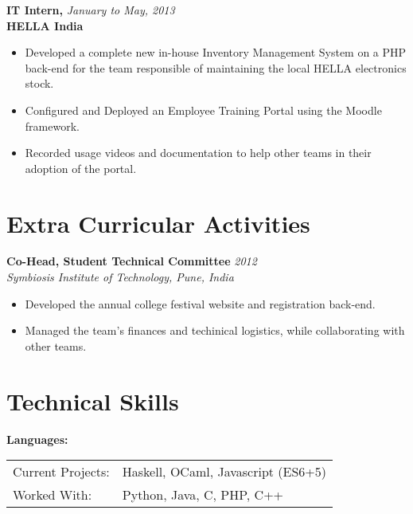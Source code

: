 \documentclass[a4paper,overlapped]{res}
\begin{document}
\begin{resume}
  \textbf{IT Intern,} \hfill \textit{January to May, 2013}\\
  \textbf{HELLA India}
  \begin{itemize}
  \item Developed a complete new in-house Inventory Management System on a PHP
    back-end for the team responsible of maintaining the local HELLA electronics stock.
  \item Configured and Deployed an Employee Training Portal using the
    Moodle framework.
  \item Recorded usage videos and documentation to help other teams in their
    adoption of the portal.
  \end{itemize}

  \section{Extra Curricular Activities}  

  \textbf{Co-Head, Student Technical Committee}   \hfill \textit{2012} \\
  \textit{Symbiosis Institute of Technology, Pune, India}
  \begin{itemize}
  \item Developed the annual college festival website and registration back-end.
  \item Managed the team's finances and techinical logistics, while collaborating 
    with other teams.
  \end{itemize}

  \section{Technical Skills} 
  \textbf{Languages:} \\ 
  \begin{tabular}{l l}
    Current Projects: & Haskell, OCaml, Javascript (ES6+5) \\ 
    Worked With: & Python, Java, C, PHP, C++ \\
  \end{tabular}\\


\end{resume}
\end{document}

